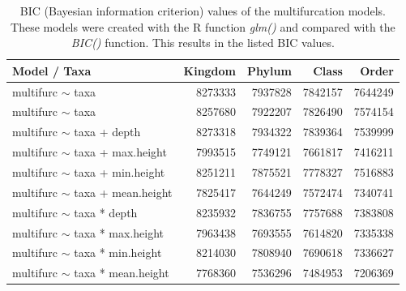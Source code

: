       \begin{table}[h]
        \begin{center}
          \begin{tabular}{ |l|r|r|r|r| }
            \hline
            \bfseries Model / Taxa & \bfseries Kingdom & \bfseries Phylum & \bfseries Class & \bfseries Order \\
            \hline \hline
            multifurc $\sim$ taxa & 8273333 & \cellcolor{green!15}7937828 & \cellcolor{green!20}7842157 & \cellcolor{green!30}7644249 \\
            multifurc $\sim$ taxa & 8257680 & \cellcolor{green!15}7922207 & \cellcolor{green!20}7826490 & \cellcolor{green!35}7574154 \\
            \hline
            multifurc $\sim$ taxa + depth & 8273318 & \cellcolor{green!15}7934322 & \cellcolor{green!20}7839364 & \cellcolor{green!35}7539999 \\
            multifurc $\sim$ taxa + max.height & \cellcolor{green!15}7993515 & \cellcolor{green!25}7749121 & \cellcolor{green!30}7661817 & \cellcolor{green!40}7416211 \\
            multifurc $\sim$ taxa + min.height & 8251211 & \cellcolor{green!20}7875521  & \cellcolor{green!25}7778327 & \cellcolor{green!35}7516883 \\
            multifurc $\sim$ taxa + mean.height & \cellcolor{green!20}7825417 & \cellcolor{green!30}7644249 & \cellcolor{green!35}7572474 & \cellcolor{green!45}7340741 \\
            \hline
            multifurc $\sim$ taxa * depth & 8235932 & \cellcolor{green!20}7836755 & \cellcolor{green!25}7757688 & \cellcolor{green!45}7383808 \\
            multifurc $\sim$ taxa * max.height & \cellcolor{green!15}7963438 & \cellcolor{green!30}7693555 & \cellcolor{green!30}7614820 & \cellcolor{green!45}7335338 \\
            multifurc $\sim$ taxa * min.height & 8214030 & \cellcolor{green!20}7808940 & \cellcolor{green!30}7690618 & \cellcolor{green!45}7336627\\
            multifurc $\sim$ taxa * mean.height & \cellcolor{green!25}7768360 & \cellcolor{green!35}7536296 & \cellcolor{green!50}7484953 & \cellcolor{green!50}7206369 \\
            \hline
          \end{tabular} 
        \end{center}
        \caption{BIC (Bayesian information criterion) values of the multifurcation models. \\
          These models were created with the R function \textit{glm()} and compared with the 
            \textit{BIC()} function. This results in the listed BIC values.}
        \label{table:BIC multifurcation} 
      \end{table}
